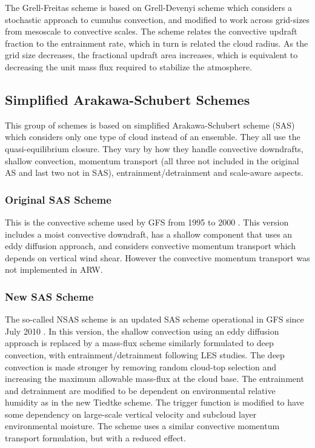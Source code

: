 The Grell-Freitas scheme \citep{grell14} is based on Grell-Devenyi 
scheme which considers a stochastic approach to cumulus convection, and modified 
to work across grid-sizes from mesoscale to convective scales. The scheme 
relates the convective updraft fraction to the entrainment rate, 
which in turn is related the cloud radius. As the grid size decreases, the 
fractional updraft area increases, which is equivalent to decreasing 
the unit mass flux required to stabilize the atmosphere.

\subsection{Simplified Arakawa-Schubert Schemes}

This group of schemes is based on simplified Arakawa-Schubert scheme (SAS) \citep{grell93} 
which considers only one type of cloud instead of an ensemble. They all use the 
quasi-equilibrium closure. They vary by how they handle convective downdrafts, 
shallow convection, momentum transport (all three not included in the original 
AS and last two not in SAS), entrainment/detrainment and scale-aware aspects.

\subsubsection{Original SAS Scheme}

This is the convective scheme used by GFS from 1995 to 2000 \citep{pan95}. This version 
includes a moist convective downdraft, has a shallow component that uses an 
eddy diffusion approach, and considers convective momentum transport which 
depends on vertical wind shear. However the convective momentum transport 
was not implemented in ARW. 

\subsubsection{New SAS Scheme}

The so-called NSAS scheme is an updated SAS scheme operational in GFS since July 2010 \citep{han11}. In this version, 
the shallow convection using an eddy diffusion approach is replaced by a mass-flux 
scheme similarly formulated to deep convection, with entrainment/detrainment 
following LES studies. The deep convection is made stronger by removing random 
cloud-top selection and increasing the maximum allowable mass-flux at the cloud base. 
The entrainment and detrainment are modified to be dependent on environmental relative 
humidity as in the new Tiedtke scheme. The trigger function is modified to have some 
dependency on large-scale vertical velocity and subcloud layer environmental moisture. 
The scheme uses a similar convective momentum transport formulation, but with a reduced effect.

